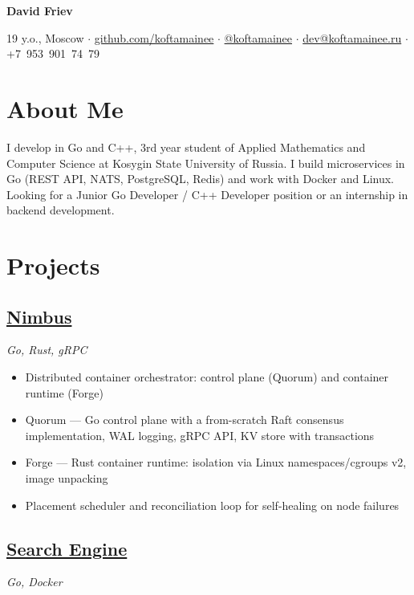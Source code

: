 \documentclass[a4paper,11pt]{article}
\begin{document}
\begin{center}
  {\Huge\bfseries\sffamily David Friev}
  \vspace{0.2em}

  19 y.o., Moscow $\cdot$
  \href{https://github.com/koftamainee}{github.com/koftamainee} $\cdot$
  \href{https://t.me/koftamainee}{@koftamainee} $\cdot$
  \href{mailto:dev@koftamainee.ru}{dev@koftamainee.ru} $\cdot$
  +7~953~901~74~79
\end{center}

\section{About Me}

I develop in Go and C++, 3rd year student of Applied Mathematics and Computer Science
at Kosygin State University of Russia.
I build microservices in Go (REST API, NATS, PostgreSQL, Redis) and work with Docker and Linux.
Looking for a Junior Go Developer / C++ Developer position or an internship in backend development.

\section{Projects}

\subsection*{\href{https://github.com/koftamainee/nimbus}{Nimbus}}
\hfill \textit{Go, Rust, gRPC}

\begin{itemize}
  \item Distributed container orchestrator: control plane (Quorum) and container runtime (Forge)
  \item Quorum --- Go control plane with a from-scratch Raft consensus implementation, WAL logging, gRPC API, KV store with transactions
  \item Forge --- Rust container runtime: isolation via Linux namespaces/cgroups v2, image unpacking
  \item Placement scheduler and reconciliation loop for self-healing on node failures
\end{itemize}

\subsection*{\href{https://github.com/koftamainee/search-engine}{Search Engine}}
\hfill \textit{Go, Docker}
\end{document}
